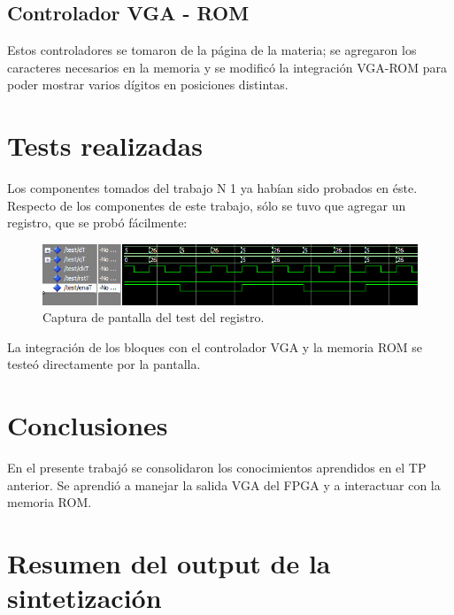 \documentclass[a4paper,10pt]{article}
\begin{document}
\subsection{Controlador VGA - ROM}
Estos controladores se tomaron de la página de la materia; se agregaron los caracteres necesarios en la memoria y se modificó la integración VGA-ROM para poder mostrar varios dígitos en posiciones distintas.

\section{Tests realizadas}
Los componentes tomados del trabajo N 1 ya habían sido probados en éste. Respecto de los componentes de este trabajo, sólo se tuvo que agregar un registro, que se probó fácilmente:
	\begin{figure}[h]
		\centering
		\includegraphics[width=17cm]{img/testReg.png}
		\caption{Captura de pantalla del test del registro.}
	\end{figure}
	
La integración de los bloques con el controlador VGA y la memoria ROM se testeó directamente por la pantalla.

\section{Conclusiones}
En el presente trabajó se consolidaron los conocimientos aprendidos en el  TP anterior. Se aprendió a manejar la salida VGA del FPGA y a interactuar con la memoria ROM.
\section{Resumen del output de la sintetización}

\end{document}
